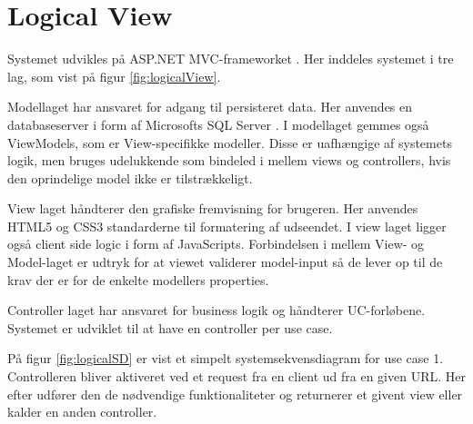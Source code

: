 \section{Logical View}\label{sec:LogicalView}
Systemet udvikles på ASP.NET MVC-frameworket \citep{aspnetmvcWeb}. Her inddeles systemet i tre lag, som vist på figur \ref{fig:logicalView}.


Modellaget har ansvaret for adgang til persisteret data. Her anvendes en databaseserver i form af Microsofts SQL Server \citep{sqlserverWeb}. I modellaget gemmes også ViewModels, som er View-specifikke modeller. Disse er uafhængige af systemets logik, men bruges udelukkende som bindeled i mellem views og controllers, hvis den oprindelige model ikke er tilstrækkeligt.

View laget håndterer den grafiske fremvisning for brugeren. Her anvendes HTML5 og CSS3 standarderne til formatering af udseendet. I view laget ligger også client side logic i form af JavaScripts. Forbindelsen i mellem View- og Model-laget er udtryk for at viewet validerer model-input så de lever op til de krav der er for de enkelte modellers properties.

Controller laget har ansvaret for business logik og håndterer UC-forløbene. Systemet er udviklet til at have en controller per use case.

På figur \ref{fig:logicalSD} er vist et simpelt systemsekvensdiagram for use case 1. Controlleren bliver aktiveret ved et request fra en client ud fra en given URL. Her efter udfører den de nødvendige funktionaliteter og returnerer et givent view eller kalder en anden controller.

